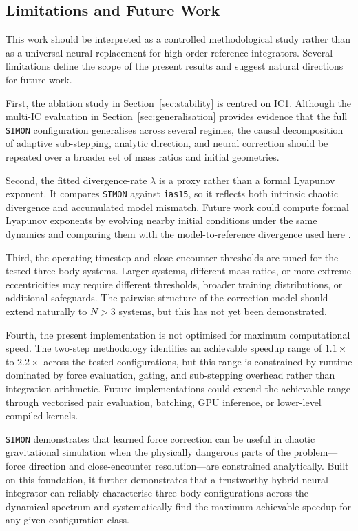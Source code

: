 \documentclass[12pt]{article}
\begin{document}
\subsection{Limitations and Future Work}
\label{sec:limitations}

This work should be interpreted as a controlled methodological study rather than as a
universal neural replacement for high-order reference integrators. Several limitations
define the scope of the present results and suggest natural directions for future work.

First, the ablation study in Section~\ref{sec:stability} is centred on IC1. Although the
multi-IC evaluation in Section~\ref{sec:generalisation} provides evidence that the full
\texttt{SIMON} configuration generalises across several regimes, the causal decomposition
of adaptive sub-stepping, analytic direction, and neural correction should be repeated over
a broader set of mass ratios and initial geometries.

Second, the fitted divergence-rate $\lambda$ is a proxy rather than a formal Lyapunov
exponent. It compares \texttt{SIMON} against \texttt{ias15}, so it reflects both intrinsic
chaotic divergence and accumulated model mismatch. Future work could compute formal
Lyapunov exponents by evolving nearby initial conditions under the same dynamics and
comparing them with the model-to-reference divergence used here \citep{sep-chaos}.

Third, the operating timestep and close-encounter thresholds are tuned for the tested
three-body systems. Larger systems, different mass ratios, or more extreme eccentricities
may require different thresholds, broader training distributions, or additional safeguards.
The pairwise structure of the correction model should extend naturally to $N>3$ systems,
but this has not yet been demonstrated.

Fourth, the present implementation is not optimised for maximum computational
speed. The two-step methodology identifies an achievable speedup range of
$1.1\times$ to $2.2\times$ across the tested configurations, but this range
is constrained by runtime dominated by force evaluation, gating, and
sub-stepping overhead rather than integration arithmetic. Future implementations
could extend the achievable range through vectorised pair evaluation, batching,
GPU inference, or lower-level compiled kernels.

\texttt{SIMON} demonstrates that learned force correction can be useful in chaotic
gravitational simulation when the physically dangerous parts of the problem---force
direction and close-encounter resolution---are constrained analytically. Built on
this foundation, it further demonstrates that a trustworthy hybrid neural integrator
can reliably characterise three-body configurations across the dynamical spectrum and
systematically find the maximum achievable speedup for any given configuration class.
\end{document}
